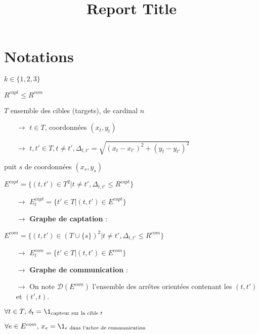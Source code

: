 \documentclass[12pt]{article}
\title{Report Title}
\date{}
\begin{document}
\maketitle

\section{Notations}

\begin{bulletlist}
  \item $k\in \{1, 2, 3\}$
  \item $R^{capt} \leq R^{com}$
  \item $T$ ensemble des cibles (targets), de cardinal $n$
  \begin{itemize}
    \item[$\rightarrow$] $t\in T$, coordonnées $(x_t, y_t)$
    \item[$\rightarrow$] $t, t'\in T, t\neq t', \Delta_{t, t'} = \sqrt{(x_t - x_{t'})^2 + (y_t - y_{t'})^2}$
  \end{itemize}
  \item puit $s$ de coordonnées $(x_s, y_s)$
  \item $E^{capt} = \{(t, t')\in T^2 | t\neq t', \Delta_{t, t'} \leq R^{capt}\}$
  \begin{itemize}
    \item[$\rightarrow$] $E^{capt}_t = \{t'\in T | (t, t')\in E^{capt}\}$
    \item[$\rightarrow$] \textbf{Graphe de captation} :  
  \end{itemize}
  \item $E^{com} = \{ (t, t')\in (T \cup \{ s \})^2 | t\neq t', \Delta_{t, t'} \leq R^{com} \}$
  \begin{itemize}
    \item[$\rightarrow$] $E^{com}_t = \{t'\in T | (t, t')\in E^{com}\}$
    \item[$\rightarrow$] \textbf{Graphe de communication}  :
    \item[$\rightarrow$] On note $\mathcal{D}(E^{com})$ l'ensemble des arrêtes orientées contenant les $(t, t')$ et $(t', t)$.
  \end{itemize}
  \item $\forall t\in T,\, \delta_t = \1_{\text{capteur sur la cible } t}$
  \item $\forall e\in E^{com},\, x_e = \1_{e \text{ dans l'arbre de communication}}$
\end{bulletlist}
\end{document}
